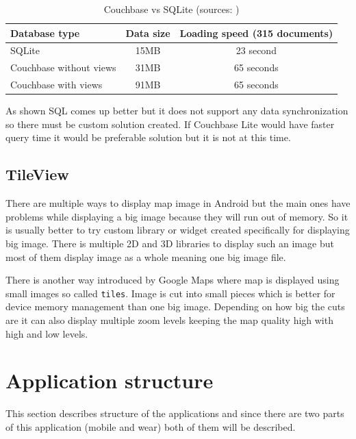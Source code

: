\begin{table}[h]
	\begin{center}
		\begin{tabular}{| l | c | c |}
			\hline
			Database type & Data size & Loading speed (315 documents) \\ \hline
			SQLite & 15MB & 23 second \\ \hline
			Couchbase without views & 31MB & 65 seconds \\ \hline
			Couchbase with views & 91MB & 65 seconds \\ \hline
		\end{tabular}
		\caption{Couchbase vs SQLite (sources: \cite{LGWSP, LGWST, HW2, PM600, AZW3})}
		\label{tab3}
	\end{center}
\end{table}

As shown SQL comes up better but it does not support any data synchronization so there must be custom solution created. If Couchbase Lite would have faster query time it would be preferable solution but it is not at this time.

\subsection{TileView}\label{subsec:TileView}
There are multiple ways to display map image in Android but the main ones have problems while displaying a big image because they will run out of memory. So it is usually better to try custom library or widget created specifically for displaying big image. There is multiple 2D and 3D libraries to display such an image but most of them display image as a whole meaning one big image file. 

There is another way introduced by Google Maps where map is displayed using small images so called \verb|tiles|. Image is cut into small pieces which is better for device memory management than one big image. Depending on how big the cuts are it can also display multiple zoom levels keeping the map quality high with high and low levels.


\section{Application structure}\label{sec:ApplicationStructure}
This section describes structure of the applications and since there are two parts of this application (mobile and wear) both of them will be described.

